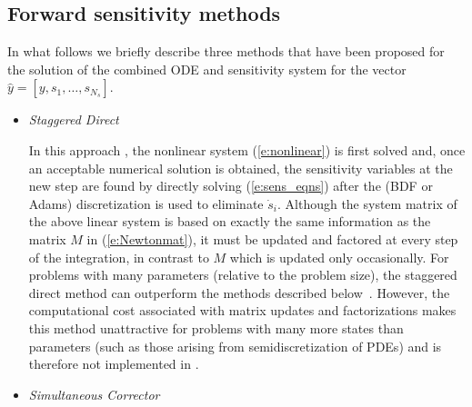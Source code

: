 \subsection{Forward sensitivity methods}
In what follows we briefly describe three methods that have been proposed for the 
solution of the combined ODE and sensitivity system for the vector
${\hat y} = [y, s_1, \ldots , s_{N_s}]$.

\begin{itemize}

\item {\em Staggered Direct}

  In this approach \cite{CaSt:85}, the nonlinear system (\ref{e:nonlinear}) is first
  solved and, once an acceptable numerical solution is obtained, the sensitivity 
  variables at the new step are found by directly solving (\ref{e:sens_eqns}) 
  after the (BDF or Adams) discretization is used to eliminate ${\dot s}_i$. 
  Although the system matrix of the above linear system is based on exactly the same
  information as the matrix $M$ in (\ref{e:Newtonmat}), it must be updated and
  factored at every step of the integration, in contrast to $M$ which is updated
  only occasionally.  For problems with many parameters (relative to the problem
  size), the staggered direct method can outperform the methods described
  below~\cite{LPZ:99}.
  However, the computational cost associated with matrix updates and factorizations 
  makes this method unattractive for problems with many more states than parameters
  (such as those arising from semidiscretization of PDEs) and is therefore not 
  implemented in {\cvodes}.
  
\item {\em Simultaneous Corrector}


\end{itemize}
